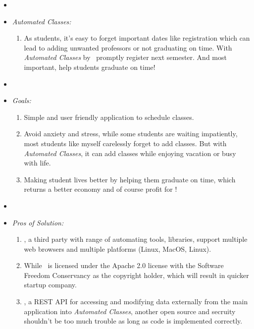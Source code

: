 \begin{itemize}
  \item[] 
  \item[] \textsl{\Large Automated Classes:}
  \begin{enumerate}
    \item[] As students, it's easy to forget important dates like registration which can lead
    to adding unwanted professors or not graduating on time. With \emph{Automated Classes} by 
    \aweco\texttrademark\ promptly register next semester. And most important, help students graduate on time!  
  \end{enumerate} 
\end{itemize}
\vspace*{0.5cm}
\begin{itemize}
  \item[] 
  \item[] \textsl{\Large Goals:}
  \begin{enumerate}
    \item Simple and user friendly application to schedule classes.
    \item Avoid anxiety and stress, while some students are waiting impatiently, most students
    like myself carelessly forget to add classes. But with \emph{Automated Classes}, it can add
    classes while enjoying vacation or busy with life.
    \item Making student lives better by helping them graduate on time, which returns a better 
    economy and of course profit for \aweco\texttrademark!
  \end{enumerate} 
\end{itemize}
\vspace*{0.5cm}
\begin{itemize}
  \item[] 
  \item[] \textsl{\Large Pros of Solution:}
  \begin{enumerate}
    \item \selenium, a third party with range of automating tools, libraries, support multiple 
    web browsers and multiple platforms (Linux, MacOS, Linux).
    \item While \selenium\ is licensed under the Apache 2.0 license with the Software Freedom 
    Conservancy as the copyright holder, which will result in quicker startup company.
    \item \canvas, a REST API for accessing and modifying data externally from the main 
    application into \emph{Automated Classes}, another open source and secruity shouldn't 
    be too much trouble as long as code is implemented correctly.
  \end{enumerate} 
\end{itemize}
